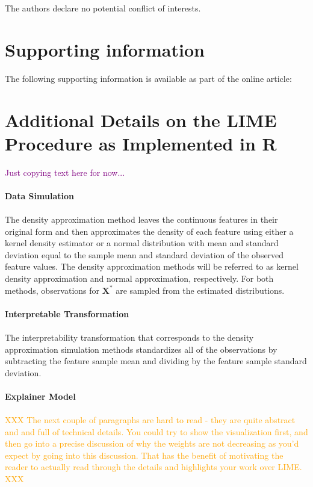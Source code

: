 \documentclass[AMS,STIX2COL]{WileyNJD-v2}\usepackage[]{graphicx}\usepackage[]{color}
\newcommand{\hh}[1]{\textcolor{orange}{#1}}
\newcommand{\kgc}[1]{\textcolor{purple}{#1}}
\begin{document}
{The authors declare no potential conflict of interests.

\section*{Supporting information}

The following supporting information is available as part of the online article:

\appendix

\section{Additional Details on the LIME Procedure as Implemented in R} \label{lime}

\kgc{Just copying text here for now...}\\
\\
\textbf{Data Simulation}\\
\\
The density approximation method leaves the continuous features in their original form and then approximates the density of each feature using either a kernel density estimator or a normal distribution with mean and standard deviation equal to the sample mean and standard deviation of the observed feature values. The density approximation methods will be referred to as kernel density approximation and normal approximation, respectively. For both methods, observations for $\textbf{X}^*$ are sampled from the estimated distributions.\\
\\
\textbf{Interpretable Transformation}\\
\\
The interpretability transformation that corresponds to the density approximation simulation methods standardizes all of the observations by subtracting the feature sample mean and dividing by the feature sample standard deviation.\\
\\
\textbf{Explainer Model}\\
\\
\hh{XXX The next couple of paragraphs are hard to read - they are quite abstract and and full of technical details. You could try to show the visualization first, and then go into a precise discussion of why the weights are not decreasing as you'd expect by going into this discussion. That has the benefit of motivating the reader to actually read through the details and highlights your work over LIME.  XXX}

}
\end{document}
